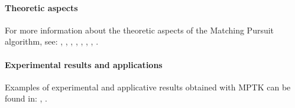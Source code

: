\documentclass[11pt,a4paper]{article}
\begin{document}
\paragraph{Theoretic aspects} For more information about the theoretic aspects
of the Matching Pursuit algorithm, see: \newline
\cite{Grib2001b}, \cite{GN2001}, \cite{Grib2001c}, \cite{ICIP03:GN},
\cite{gribonval03:_spars}, \cite{IRISA03:GV}, \cite{gribonval03:_highl},
\cite{GribFig}.

\paragraph{Experimental results and applications} Examples of experimental and
applicative results obtained with MPTK can be found in: \newline
\cite{WASPAA05}, \cite{LESAGE_ICA06}.


{
}
\end{document}
